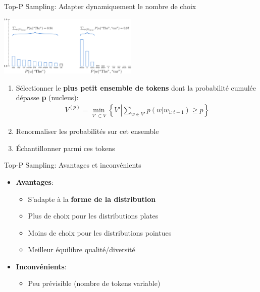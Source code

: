 \documentclass[aspectratio=169]{beamer}
\begin{document}
\begin{frame}{Top-P Sampling: Adapter dynamiquement le nombre de choix}
    \begin{center}
        \includegraphics[width=0.5\textwidth]{images/top_p.png}
    \end{center}
    
    \begin{enumerate}
        \item Sélectionner le \textbf{plus petit ensemble de tokens} dont la probabilité cumulée dépasse \textbf{p} (nucleus):
        \begin{align*}
            V^{(p)} = \min_{V' \subset V} \left\{ V' \left| \sum_{w \in V'} p(w|w_{1:t-1}) \geq p \right. \right\}
        \end{align*}
        \item Renormaliser les probabilités sur cet ensemble
        \item Échantillonner parmi ces tokens
    \end{enumerate}
\end{frame}

\begin{frame}{Top-P Sampling: Avantages et inconvénients}
    \begin{itemize}
        \item \textbf{Avantages}:
        \begin{itemize}
            \item S'adapte à la \textbf{forme de la distribution}
            \item Plus de choix pour les distributions plates
            \item Moins de choix pour les distributions pointues
            \item Meilleur équilibre qualité/diversité
        \end{itemize}
        \item \textbf{Inconvénients}:
        \begin{itemize}
            \item Peu prévisible (nombre de tokens variable)
        \end{itemize}
    \end{itemize}
\end{frame}
\end{document}
